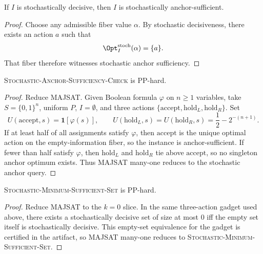 \begin{proposition}\label{prop:stochastic-anchor-refinement}
If $I$ is stochastically decisive, then $I$ is stochastically anchor-sufficient.
\end{proposition}


\begin{proof}
Choose any admissible fiber value $\alpha$. By stochastic decisiveness, there exists an action $a$ such that
\[
\Opt^{\mathrm{stoch}}_I(\alpha)=\{a\}.
\]
That fiber therefore witnesses stochastic anchor sufficiency.
\end{proof}

\begin{theorem}\label{thm:stochastic-anchor-hard}
\textsc{Stochastic-Anchor-Sufficiency-Check} is PP-hard.
\end{theorem}


\begin{proof}
Reduce MAJSAT. Given Boolean formula $\varphi$ on $n\geq 1$ variables, take $S=\{0,1\}^n$, uniform $P$, $I=\emptyset$, and three actions $\{\mathrm{accept},\mathrm{hold}_L,\mathrm{hold}_R\}$. Set
\[
U(\mathrm{accept},s)=\mathbf{1}[\varphi(s)],\qquad
U(\mathrm{hold}_L,s)=U(\mathrm{hold}_R,s)=\frac12-2^{-(n+1)}.
\]
If at least half of all assignments satisfy $\varphi$, then $\mathrm{accept}$ is the unique optimal action on the empty-information fiber, so the instance is anchor-sufficient. If fewer than half satisfy $\varphi$, then $\mathrm{hold}_L$ and $\mathrm{hold}_R$ tie above $\mathrm{accept}$, so no singleton anchor optimum exists. Thus MAJSAT many-one reduces to the stochastic anchor query.
\end{proof}

\begin{theorem}\label{thm:stochastic-minimum-hard}
\textsc{Stochastic-Minimum-Sufficient-Set} is PP-hard.
\end{theorem}


\begin{proof}
Reduce MAJSAT to the $k=0$ slice. In the same three-action gadget used above, there exists a stochastically decisive set of size at most $0$ iff the empty set itself is stochastically decisive. This empty-set equivalence for the gadget is certified in the artifact, so MAJSAT many-one reduces to \textsc{Stochastic-Minimum-Sufficient-Set}.
\end{proof}

